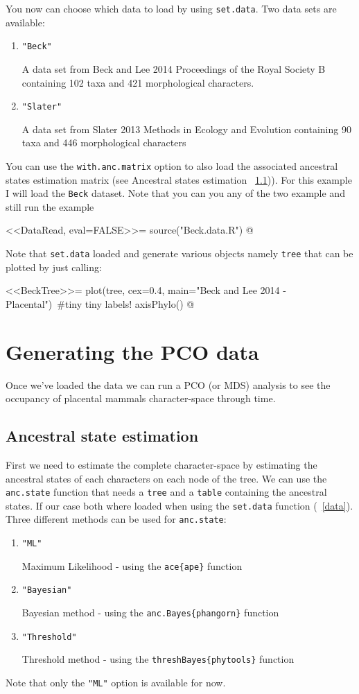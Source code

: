 \documentclass[a4paper,11pt]{article}
\begin{document}
You now can choose which data to load by using \texttt{set.data}. Two data sets are available:
\begin{enumerate}
\item{\texttt{"Beck"}}

A data set from Beck and Lee 2014 Proceedings of the Royal Society B containing 102 taxa and 421 morphological characters.

\item{\texttt{"Slater"}}

A data set from Slater 2013 Methods in Ecology and Evolution containing 90 taxa and 446 morphological characters
\end{enumerate}
You can use the \texttt{with.anc.matrix} option to also load the associated ancestral states estimation matrix (see Ancestral states estimation ~\ref{ACE})).
For this example I will load the \texttt{Beck} dataset. Note that you can you any of the two example and still run the example

<<DataRead, eval=FALSE>>=
source("Beck.data.R")
@

Note that \texttt{set.data} loaded and generate various objects namely \texttt{tree} that can be plotted by just calling:

<<BeckTree>>=
plot(tree, cex=0.4, main="Beck and Lee 2014 - Placental") #tiny tiny labels!
axisPhylo()
@

\section{Generating the PCO data}
Once we've loaded the data we can run a PCO (or MDS) analysis to see the occupancy of placental mammals character-space through time.

\subsection{Ancestral state estimation} \label{ACE}
First we need to estimate the complete character-space by estimating the ancestral states of each characters on each node of the tree.
We can use the \texttt{anc.state} function that needs a \texttt{tree} and a \texttt{table} containing the ancestral states.
If our case both where loaded when using the \texttt{set.data} function (~\ref{data}).
Three different methods can be used for \texttt{anc.state}:
\begin{enumerate}
\item{\texttt{"ML"}}

Maximum Likelihood - using the \texttt{ace\{ape\}} function
\item{\texttt{"Bayesian"}}

Bayesian method - using the \texttt{anc.Bayes\{phangorn\}} function

\item{\texttt{"Threshold"}}

Threshold method - using the \texttt{threshBayes\{phytools\}} function
\end{enumerate}
Note that only the \texttt{"ML"} option is available for now.
\end{document}
